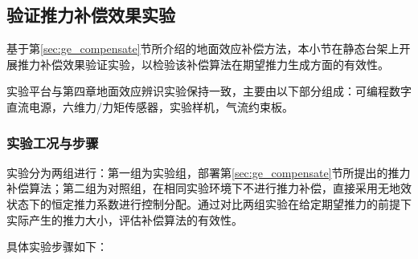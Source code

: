 \subsection{验证推力补偿效果实验}

基于第\ref{sec:ge_compensate}节所介绍的地面效应补偿方法，本小节在静态台架上开展推力补偿效果验证实验，以检验该补偿算法在期望推力生成方面的有效性。

实验平台与第四章地面效应辨识实验保持一致，主要由以下部分组成：可编程数字直流电源，六维力/力矩传感器，实验样机，气流约束板。

\subsubsection{实验工况与步骤}

实验分为两组进行：第一组为实验组，部署第\ref{sec:ge_compensate}节所提出的推力补偿算法；第二组为对照组，在相同实验环境下不进行推力补偿，直接采用无地效状态下的恒定推力系数进行控制分配。通过对比两组实验在给定期望推力的前提下实际产生的推力大小，评估补偿算法的有效性。

具体实验步骤如下：

